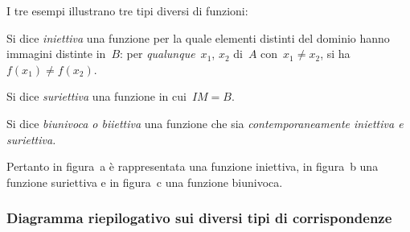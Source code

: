 I tre esempi illustrano tre tipi diversi di funzioni:

\begin{definizione}
Si dice \emph{iniettiva} una funzione per la quale elementi distinti del
dominio hanno immagini distinte in~\(B\): per \emph{qualunque}~\(x_1\), 
\(x_2\) di~\(A\) con~\(x_1\neq x_2\), si ha~\(f(x_1)\neq f(x_2)\).
\end{definizione}

\begin{definizione}
Si dice \emph{suriettiva} una funzione in cui~\(IM = B\).
\end{definizione}

\begin{definizione}
Si dice \emph{biunivoca o biiettiva} una funzione che sia
\emph{contemporaneamente iniettiva e suriettiva.}
\end{definizione}

Pertanto in figura~a è rappresentata una funzione iniettiva, in figura~b una
funzione suriettiva e in figura~c una funzione biunivoca.

\subsubsection{Diagramma riepilogativo sui diversi tipi di corrispondenze}

\begin{center}
 
\end{center}

